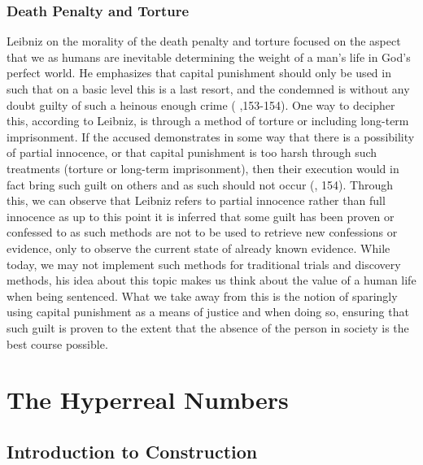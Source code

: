 \documentclass[12pt]{report}
\begin{document}
\section*{Death Penalty and Torture}
Leibniz on the morality of the death penalty and torture focused on the aspect that we as humans are inevitable determining the weight of a man's life in God's perfect world.
He emphasizes that capital punishment should only be used in such that on a basic level this is a last resort, and the condemned is without any doubt guilty of such a heinous enough crime ( ,153-154).
One way to decipher this, according to Leibniz, is through a method of torture or including long-term imprisonment.
If the accused demonstrates in some way that there is a possibility of partial innocence, or that capital punishment is too harsh through such treatments (torture or long-term imprisonment), then their execution would in fact bring such guilt on others and as such should not occur (, 154).
Through this, we can observe that Leibniz refers to partial innocence rather than full innocence as up to this point it is inferred that some guilt has been proven or confessed to as such methods are not to be used to retrieve new confessions or evidence, only to observe the current state of already known evidence.
While today, we may not implement such methods for traditional trials and discovery methods, his idea about this topic makes us think about the value of a human life when being sentenced.
What we take away from this is the notion of sparingly using capital punishment as a means of justice and when doing so, ensuring that such guilt is proven to the extent that the absence of the person in society is the best course possible.
\newpage
\part{The Hyperreal Numbers}
\newpage
\chapter{Introduction to Construction}
\end{document}
